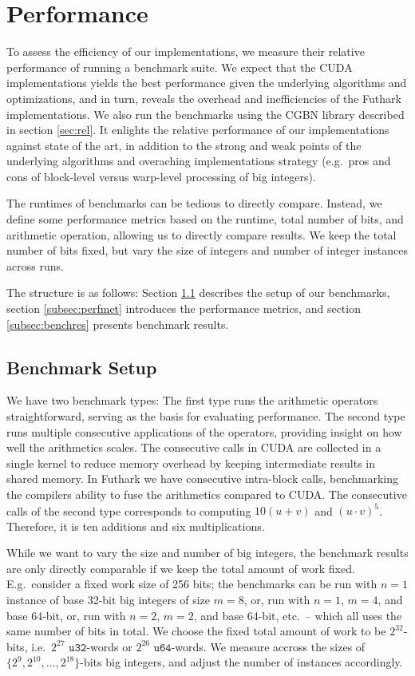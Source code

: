 \section{Performance}
\label{sec:per}

To assess the efficiency of our implementations, we measure their relative
performance of running a benchmark suite. We expect that the CUDA
implementations yields the best performance given the underlying algorithms and
optimizations, and in turn, reveals the overhead and inefficiencies of the
Futhark implementations. We also run the benchmarks using the CGBN library
described in section \ref{sec:rel}. It enlights the relative performance of our
implementations against state of the art, in addition to the strong and weak
points of the underlying algorithms and overaching implementations strategy
(e.g.\ pros and cons of block-level versus warp-level processing of big
integers).

The runtimes of benchmarks can be tedious to directly compare. Instead, we
define some performance metrics based on the runtime, total number of bits, and
arithmetic operation, allowing us to directly compare results. We keep the total
number of bits fixed, but vary the size of integers and number of integer
instances across runs.

The structure is as follows: Section \ref{subsec:benchset} describes the setup
of our benchmarks, section \ref{subsec:perfmet} introduces the performance
metrics, and section \ref{subsec:benchres} presents benchmark results.

\subsection{Benchmark Setup}
\label{subsec:benchset}

We have two benchmark types: The first type runs the arithmetic operators
straightforward, serving as the basis for evaluating performance. The second
type runs multiple consecutive applications of the operators, providing insight
on how well the arithmetics scales. The consecutive calls in CUDA are collected
in a single kernel to reduce memory overhead by keeping intermediate results in
shared memory. In Futhark we have consecutive intra-block calls, benchmarking
the compilers ability to fuse the arithmetics compared to CUDA. The consecutive
calls of the second type corresponds to computing $10(u+v)$ and $(u\cdot
v)^5$. Therefore, it is ten additions and six multiplications.

While we want to vary the size and number of big integers, the benchmark results
are only directly comparable if we keep the total amount of work fixed. E.g.\
consider a fixed work size of 256 bits; the benchmarks can be run with $n=1$
instance of base 32-bit big integers of size $m=8$, or, run with $n=1$, $m=4$,
and base 64-bit, or, run with $n=2$, $m=2$, and base 64-bit, etc.\ -- which all
uses the same number of bits in total. We choose the fixed total amount of work
to be $2^{32}$-bits, i.e.\ $2^{27}$ $\mathtt{u32}$-words or $2^{26}$
$\mathtt{u64}$-words. We measure accross the sizes of
$\{2^9,2^{10},\ldots,2^{18}\}$-bits big integers, and adjust the number of instances
accordingly.


